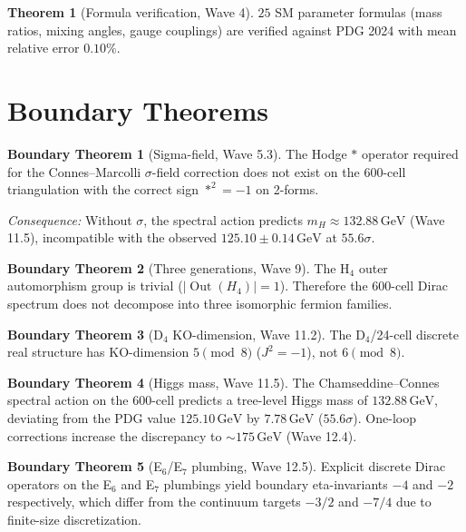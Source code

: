 \documentclass[11pt,a4paper]{article}
\theoremstyle{definition}
\newtheorem{theorem}{Theorem}[section]
\newtheorem{boundary}{Boundary Theorem}
\begin{document}
\begin{theorem}[Formula verification, Wave 4]\label{thm:formulas}
  $25$ SM parameter formulas (mass ratios, mixing angles, gauge couplings)
  are verified against PDG 2024 with mean relative error $0.10\%$.
\end{theorem}

\section{Boundary Theorems}\label{sec:boundary}

\begin{boundary}[Sigma-field, Wave 5.3]\label{boundary:sigma}
  The Hodge $*$ operator required for the Connes--Marcolli $\sigma$-field
correction does not exist on the 600-cell triangulation with the correct
sign $*^2 = -1$ on 2-forms.
\end{boundary}
\textit{Consequence:} Without $\sigma$, the spectral action predicts
$m_H \approx 132.88\,\text{GeV}$ (Wave 11.5), incompatible with the
observed $125.10 \pm 0.14\,\text{GeV}$ at $55.6\sigma$.

\begin{boundary}[Three generations, Wave 9]\label{boundary:3gen}
  The H$_4$ outer automorphism group is trivial ($|\operatorname{Out}(H_4)| = 1$).
  Therefore the 600-cell Dirac spectrum does not decompose into three
  isomorphic fermion families.
\end{boundary}

\begin{boundary}[D$_4$ KO-dimension, Wave 11.2]\label{boundary:d4}
  The D$_4$/24-cell discrete real structure has KO-dimension
  $5 \pmod 8$ ($J^2 = -1$), not $6 \pmod 8$.
\end{boundary}

\begin{boundary}[Higgs mass, Wave 11.5]\label{boundary:higgs}
  The Chamseddine--Connes spectral action on the 600-cell predicts a
tree-level Higgs mass of $132.88\,\text{GeV}$, deviating from the PDG
value $125.10\,\text{GeV}$ by $7.78\,\text{GeV}$ ($55.6\sigma$).
One-loop corrections increase the discrepancy to $\sim 175\,\text{GeV}$
(Wave 12.4).
\end{boundary}

\begin{boundary}[E$_6$/E$_7$ plumbing, Wave 12.5]\label{boundary:e6e7}
  Explicit discrete Dirac operators on the E$_6$ and E$_7$ plumbings yield
  boundary eta-invariants $-4$ and $-2$ respectively, which differ from the
  continuum targets $-3/2$ and $-7/4$ due to finite-size discretization.
\end{boundary}
\end{document}
